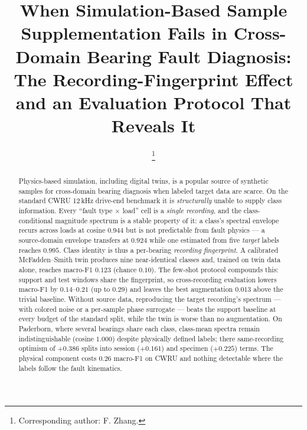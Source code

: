 \documentclass[journal]{IEEEtran}
\begin{document}
\title{When Simulation-Based Sample Supplementation Fails in Cross-Domain Bearing
Fault Diagnosis: The Recording-Fingerprint Effect and an Evaluation Protocol
That Reveals It}

\author{%
\and
{}
%
\thanks{Corresponding author: F. Zhang.}%
}

\maketitle

\begin{abstract}
Physics-based simulation, including digital twins, is a
popular source of synthetic samples for cross-domain bearing
diagnosis when labeled target data are scarce. On the standard CWRU 12\,kHz
drive-end benchmark it is \emph{structurally} unable to supply
class information. Every ``fault type $\times$ load'' cell is a \emph{single
recording}, and the class-conditional magnitude spectrum is a stable property
of it: a class's spectral envelope recurs across loads at cosine
$0.944$ but is not predictable from fault physics --- a source-domain
envelope transfers at $0.924$ while one estimated from five
\emph{target} labels reaches $0.995$. Class identity is thus a
per-bearing \emph{recording fingerprint}. A calibrated McFadden--Smith twin
produces nine near-identical
classes and, trained on twin data alone, reaches macro-F1 $0.123$ (chance
$0.10$). The few-shot protocol compounds this:
support and test windows share the fingerprint, so cross-recording evaluation
lowers macro-F1 by $0.14$--$0.21$ (up to $0.29$) and leaves the best augmentation
$0.013$ above the trivial baseline. Without source data, reproducing the
target recording's spectrum --- with colored noise or a per-sample phase
surrogate --- beats the support baseline at every budget of the standard split,
while the twin is worse than no augmentation. On Paderborn, where several bearings share each class, class-mean
spectra remain indistinguishable (cosine $1.000$) despite physically defined
labels; there same-recording optimism of $+0.386$ splits
into session ($+0.161$) and specimen ($+0.225$) terms. The physical component
costs $0.26$ macro-F1 on CWRU and nothing detectable where the labels follow the
fault kinematics.
\end{abstract}
\end{document}
